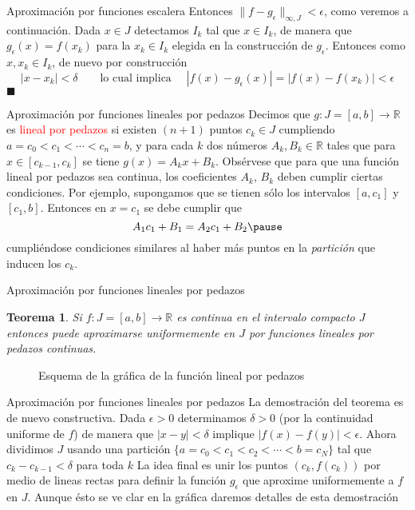 \documentclass[xcolor=dvipsnames,10pt,handout, draft]{beamer}
\newcommand{\incfig}[1]{%
    \def\svgwidth{3.5in}
    {#1.pdf_tex}
}
\newcommand{\rz}{\mathbb R}
\newtheorem*{teo}{Teorema}
\begin{document}
\begin{frame}{Aproximaci\'on por funciones escalera}
Entonces $\|f-g_\epsilon\|_{\infty,J}<\epsilon$, como veremos a continuaci\'on.
\pause\vskip5pt
Dada $x\in J$ detectamos $I_k$ tal que $x\in I_k$, de manera que $g_\epsilon(x)=f(x_k)$ para la $x_k\in I_k$ elegida en la construcci\'on de $g_\epsilon$.
\pause\vskip5pt
Entonces como $x,x_k\in I_k$, de nuevo por construcci\'on 
$$|x-x_k|<\delta\qquad\text{lo cual implica }\quad |f(x)-g_\epsilon(x)|=|f(x)-f(x_k)|<\epsilon$$
\hfill$\blacksquare$
\end{frame}


\begin{frame}{Aproximaci\'on por funciones lineales por pedazos}
Decimos que $g:J=[a,b]\to\rz$ es \textcolor{red}{lineal por pedazos} si existen $(n+1)$ puntos $c_k\in J$ cumpliendo $a=c_0<c_1<\cdots<c_n=b$, \pause y para cada $k$ dos n\'umeros $A_k,B_k\in\rz$ tales que para $x\in[c_{k-1},c_k]$ se tiene $g(x)=A_kx+B_k$.
\vskip8pt\pause
Obs\'ervese que para que una funci\'on lineal por pedazos sea continua, los coeficientes $A_k$, $B_k$ deben cumplir ciertas condiciones. 
\vskip4pt\pause
Por ejemplo, supongamos que se tienen s\'olo los intervalos $[a,c_1]$ y $[c_1,b]$.  
\pause Entonces en $x=c_1$ se debe cumplir que 
$$A_1c_1+B_1=A_2c_1+B_2\pause$$
cumpli\'endose condiciones similares al haber m\'as puntos en la {\em partici\'on} que inducen los $c_k$.
\end{frame}


\begin{frame}{Aproximaci\'on por funciones lineales por pedazos}
\begin{teo}
Si $f:J=[a,b]\to\rz$ es continua en el intervalo compacto $J$ entonces puede aproximarse uniformemente en $J$ por funciones lineales por pedazos continuas. \pause
\end{teo}
\begin{figure}[ht]
    \centering
\caption{Esquema de la gr\'afica de la funci\'on lineal por pedazos}
\end{figure}
\end{frame}


\begin{frame}{Aproximaci\'on por funciones lineales por pedazos}
La demostraci\'on del teorema es de nuevo constructiva. 
\pause\vskip5pt 
Dada $\epsilon>0$ determinamos $\delta>0$ (por la continuidad uniforme de $f$) de manera que $|x-y|<\delta$ implique $|f(x)-f(y)|<\epsilon$.
\pause\vskip5pt 
Ahora dividimos $J$ usando una partici\'on  $\{a=c_0<c_1<c_2<\cdots<b=c_N\}$ tal que $c_k-c_{k-1}<\delta$ para toda $k$ 
\pause\vskip5pt 
La idea final es unir los puntos $(c_k,f(c_k))$ por medio de lineas rectas para definir la funci\'on $g_\epsilon$ que aproxime uniformemente a $f$ en $J$.
\pause\vskip5pt 
Aunque \'esto se ve clar en la gr\'afica daremos detalles de esta demostraci\'on
\end{frame}
\end{document}
